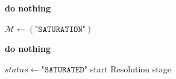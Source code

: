 \begin{algorithm}[H]
\caption{Procedures}
\begin{algorithmic}[1]
 
    \State \textbf{do nothing}
\EndProcedure
 
\Statex
 
    \State $\mathcal{M} \leftarrow (\texttt{"SATURATION"})$
\EndProcedure
 
\Statex
 
    \State \textbf{do nothing}
\EndProcedure
 
\Statex
 
    \State $status \leftarrow \texttt{"SATURATED"}$
    \State start Resolution stage
\EndProcedure
 
\end{algorithmic}
\end{algorithm}


